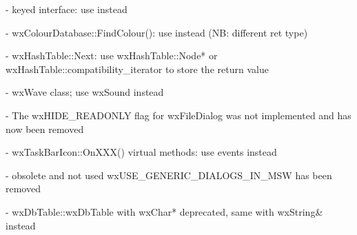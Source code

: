 -  keyed interface: use  instead

- wxColourDatabase::FindColour(): use  instead (NB: different ret type)

- wxHashTable::Next: use wxHashTable::Node* or
                     wxHashTable::compatibility\_iterator to store the return
                     value

- wxWave class; use wxSound instead

- The wxHIDE\_READONLY flag for wxFileDialog was not implemented
  and has now been removed

- wxTaskBarIcon::OnXXX() virtual methods: use events instead

- obsolete and not used wxUSE\_GENERIC\_DIALOGS\_IN\_MSW has been removed

- wxDbTable::wxDbTable with wxChar* deprecated, same with wxString& instead

